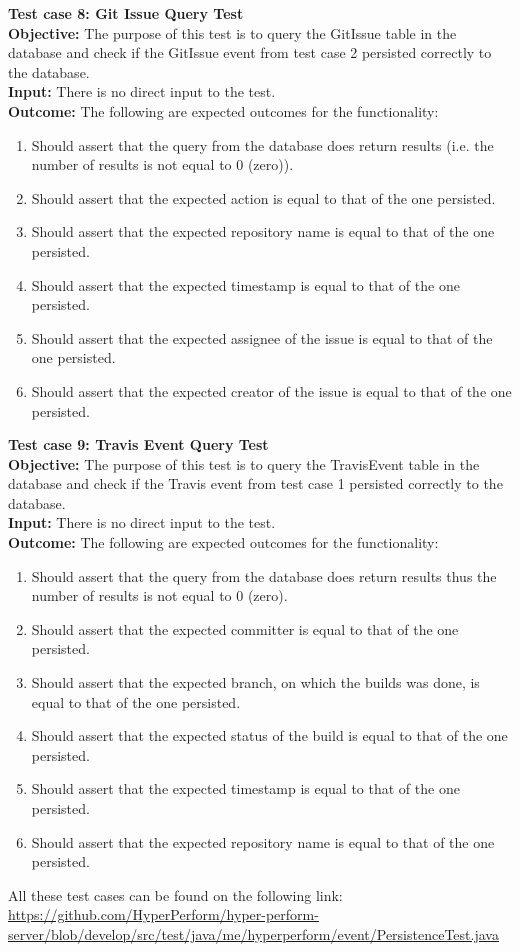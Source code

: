 \documentclass[11pt,a4paper]{article}
\begin{document}
\noindent
\textbf{Test case 8: Git Issue Query Test} \\
\textbf{Objective: } The purpose of this test is to query the GitIssue table in the database and check if the GitIssue event from test case 2 persisted correctly to the database. \\
\textbf{Input: } There is no direct input to the test. \\
\textbf{Outcome: } The following are expected outcomes for the functionality:
\begin{enumerate}
	\item Should assert that the query from the database does return results (i.e. the number of results is not equal to 0 (zero)).
	\item Should assert that the expected action is equal to that of the one persisted.
	\item Should assert that the expected repository name is equal to that of the one persisted.
	\item Should assert that the expected timestamp is equal to that of the one persisted.
	\item Should assert that the expected assignee of the issue is equal to that of the one persisted.
	\item Should assert that the expected creator of the issue is equal to that of the one persisted.\\
\end{enumerate}
\noindent
\textbf{Test case 9: Travis Event Query Test} \\
\textbf{Objective: } The purpose of this test is to query the TravisEvent table in the database and check if the Travis event from test case 1 persisted correctly to the database. \\
\textbf{Input: } There is no direct input to the test. \\
\textbf{Outcome: } The following are expected outcomes for the functionality:
\begin{enumerate}
	\item Should assert that the query from the database does return results thus the number of results is not equal to 0 (zero).
	\item Should assert that the expected committer is equal to that of the one persisted.
	\item Should assert that the expected branch, on which the builds was done, is equal to that of the one persisted.
	\item Should assert that the expected status of the build is equal to that of the one persisted.
	\item Should assert that the expected timestamp is equal to that of the one persisted.
	\item Should assert that the expected repository name is equal to that of the one persisted.\\
\end{enumerate}
All these test cases can be found on the following link:
\url{https://github.com/HyperPerform/hyper-perform-server/blob/develop/src/test/java/me/hyperperform/event/PersistenceTest.java}\\
\end{document}
